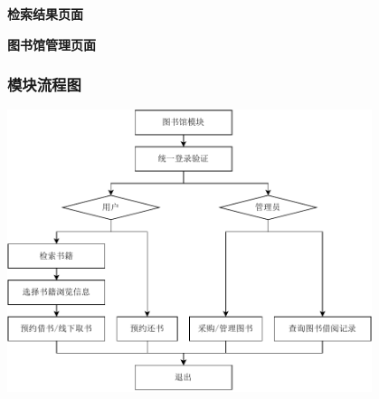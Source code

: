 \documentclass{article}
\begin{document}
\begin{center}
\textbf{检索结果页面}
\end{center}

\begin{center}
\textbf{图书馆管理页面}
\end{center}

\subsubsection{模块流程图}
\begin{center}
    \includegraphics[width=0.8\textwidth]{fig/library-flowchart.pdf}
\end{center}
\end{document}
